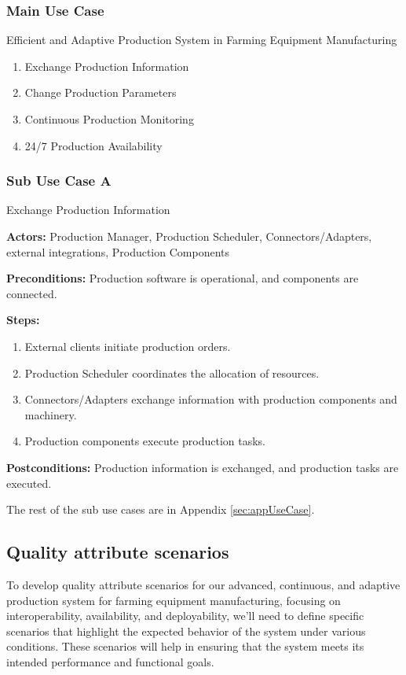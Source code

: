 \documentclass[conference]{IEEEtran}
\begin{document}
\subsubsection*{Main Use Case}

Efficient and Adaptive Production System in Farming Equipment Manufacturing
\begin{enumerate}[label=\Alph*.]
    \item Exchange Production Information
    \item Change Production Parameters
    \item Continuous Production Monitoring
    \item 24/7 Production Availability
\end{enumerate}

\subsubsection*{Sub Use Case A}
Exchange Production Information

\textbf{Actors:} Production Manager, Production Scheduler, Connectors/Adapters, external integrations, Production Components

\textbf{Preconditions:} Production software is operational, and components are connected.

\textbf{Steps:}
\begin{enumerate}
    \item External clients initiate production orders.
    \item Production Scheduler coordinates the allocation of resources.
    \item Connectors/Adapters exchange information with production components and machinery.
    \item Production components execute production tasks.
\end{enumerate}

\textbf{Postconditions:} Production information is exchanged, and production tasks are executed.

The rest of the sub use cases are in Appendix \ref{sec:appUseCase}.


\subsection{Quality attribute scenarios}
\label{sec:qas}
To develop quality attribute scenarios for our advanced, continuous, and adaptive production system for farming equipment manufacturing, focusing on interoperability, availability, and deployability, we'll need to define specific scenarios that highlight the expected behavior of the system under various conditions. These scenarios will help in ensuring that the system meets its intended performance and functional goals.
\end{document}
